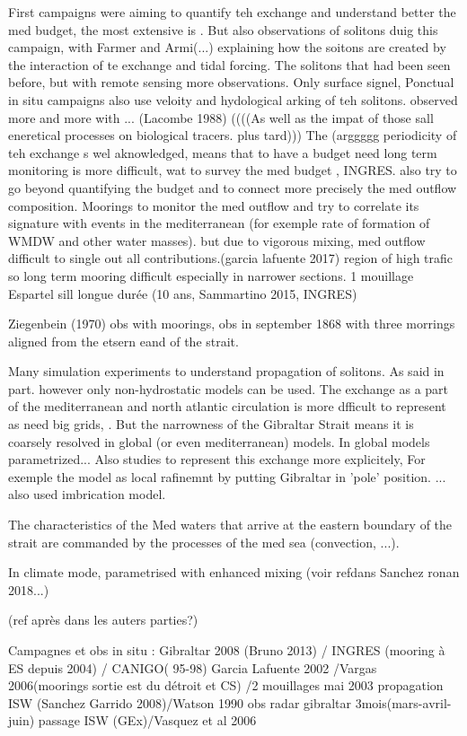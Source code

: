 First campaigns were aiming to quantify teh exchange and understand better the med budget, the most extensive is  . But also observations of solitons duig this campaign, with Farmer and Armi(...) explaining how the soitons are created by the interaction of te exchange and tidal forcing. The solitons that had been seen before, but with remote sensing more observations. Only surface signel, Ponctual in situ campaigns also use veloity and hydological arking of teh solitons. observed more and more with ... (Lacombe 1988) ((((As well as the impat of those sall eneretical processes on biological tracers. plus tard)))
The (arggggg periodicity of teh exchange s wel aknowledged, means that to have a budget need long term monitoring is more difficult, wat to survey the med budget , INGRES. also try to go beyond quantifying the budget and to connect more precisely the med outflow composition.
Moorings to monitor the med outflow and try to correlate its signature with events in the mediterranean (for exemple rate of formation of WMDW and other water masses). but due to vigorous mixing, med outflow difficult to single out all contributions.(garcia lafuente 2017) region of high trafic so long term mooring difficult especially in narrower sections. 1 mouillage Espartel sill longue durée (10 ans, Sammartino 2015, INGRES)

Ziegenbein (1970) obs with moorings, obs in september 1868 with three morrings aligned from the etsern eand of the strait. 

Many simulation experiments to understand propagation of solitons. As said in part. however only non-hydrostatic models can be used. The exchange as a part of the mediterranean and north atlantic circulation is more dfficult to represent as need big grids, . 
But the narrowness of the Gibraltar Strait means it is coarsely resolved in global (or even mediterranean) models. In global models parametrized...
Also studies to represent this exchange more explicitely, For exemple the model as local rafinemnt by putting Gibraltar in 'pole' position. ... also used imbrication model.

The characteristics of the Med waters that arrive at the eastern boundary of the strait are commanded by the processes of the med sea (convection, ...). 


In climate mode, parametrised with enhanced mixing (voir refdans Sanchez ronan 2018...)

(ref après dans les auters parties?)

Campagnes et obs in situ : Gibraltar 2008 (Bruno 2013) / INGRES (mooring à ES depuis 2004) / CANIGO( 95-98) Garcia Lafuente 2002 /Vargas 2006(moorings sortie est du détroit et CS) /2 mouillages mai 2003 propagation ISW (Sanchez Garrido 2008)/Watson 1990 obs radar gibraltar 3mois(mars-avril-juin) passage ISW (GEx)/Vasquez et al 2006\\

